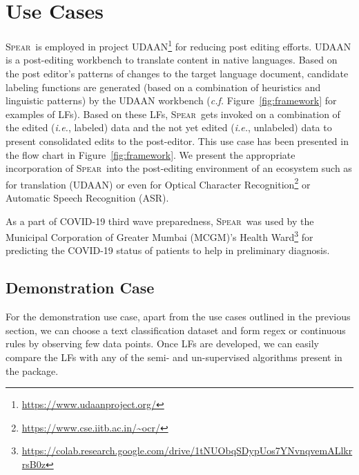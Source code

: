\documentclass[11pt]{article}
\newcommand{\spear}{\mbox{\textsc{Spear}}}
\begin{document}
\section {Use Cases}

\spear\ is employed in project UDAAN\footnote{\url{https://www.udaanproject.org/}} for reducing post editing efforts. UDAAN \cite{udaan} is a post-editing workbench to translate content in native languages. Based on the post editor's patterns of changes to the target language document, candidate labeling functions are generated (based on a combination of heuristics and linguistic patterns) by the UDAAN workbench ({\em c.f.} Figure~\ref{fig:framework} for examples of LFs). Based on these LFs, \spear\ gets invoked on a combination of the edited ({\em i.e.}, labeled) data and the not yet edited ({\em i.e.}, unlabeled) data to present consolidated edits to the post-editor. This use case has been presented in the flow chart in Figure~\ref{fig:framework}. We present the appropriate incorporation of \spear\ into the post-editing environment of an ecosystem such as for translation (UDAAN) or even for Optical Character Recognition\footnote{\url{https://www.cse.iitb.ac.in/~ocr/}} or Automatic Speech Recognition (ASR). %

As a part of COVID-19 third wave preparedness, \spear\ was used by the Municipal Corporation of Greater Mumbai (MCGM)’s Health Ward\footnote{\url{https://colab.research.google.com/drive/1tNUObqSDypUos7YNvnqvemALlkrrsB0z}} for predicting the COVID-19 status of patients to help in preliminary diagnosis. 

\subsection{Demonstration Case}
For the demonstration use case, apart from the use cases outlined in the previous section, we can choose a text classification dataset and form regex or continuous rules by observing few data points. Once LFs are developed, we can easily compare the LFs with any of the semi- and un-supervised algorithms present in the package. 
\end{document}

